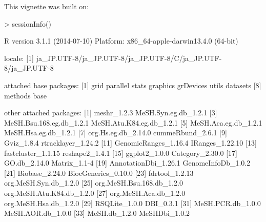 \documentclass[11pt]{article}
\begin{document}
This vignette was built on:
\begin{Schunk}
\begin{Sinput}
> sessionInfo()
\end{Sinput}
\begin{Soutput}
R version 3.1.1 (2014-07-10)
Platform: x86_64-apple-darwin13.4.0 (64-bit)

locale:
[1] ja_JP.UTF-8/ja_JP.UTF-8/ja_JP.UTF-8/C/ja_JP.UTF-8/ja_JP.UTF-8

attached base packages:
[1] grid      parallel  stats     graphics  grDevices utils     datasets 
[8] methods   base     

other attached packages:
 [1] meshr_1.2.3               MeSH.Syn.eg.db_1.2.1     
 [3] MeSH.Bsu.168.eg.db_1.2.1  MeSH.Atu.K84.eg.db_1.2.1 
 [5] MeSH.Aca.eg.db_1.2.1      MeSH.Hsa.eg.db_1.2.1     
 [7] org.Hs.eg.db_2.14.0       cummeRbund_2.6.1         
 [9] Gviz_1.8.4                rtracklayer_1.24.2       
[11] GenomicRanges_1.16.4      IRanges_1.22.10          
[13] fastcluster_1.1.15        reshape2_1.4.1           
[15] ggplot2_1.0.0             Category_2.30.0          
[17] GO.db_2.14.0              Matrix_1.1-4             
[19] AnnotationDbi_1.26.1      GenomeInfoDb_1.0.2       
[21] Biobase_2.24.0            BiocGenerics_0.10.0      
[23] fdrtool_1.2.13            org.MeSH.Syn.db_1.2.0    
[25] org.MeSH.Bsu.168.db_1.2.0 org.MeSH.Atu.K84.db_1.2.0
[27] org.MeSH.Aca.db_1.2.0     org.MeSH.Hsa.db_1.2.0    
[29] RSQLite_1.0.0             DBI_0.3.1                
[31] MeSH.PCR.db_1.0.0         MeSH.AOR.db_1.0.0        
[33] MeSH.db_1.2.0             MeSHDbi_1.0.2            


\end{Soutput}
\end{Schunk}
\end{document}
